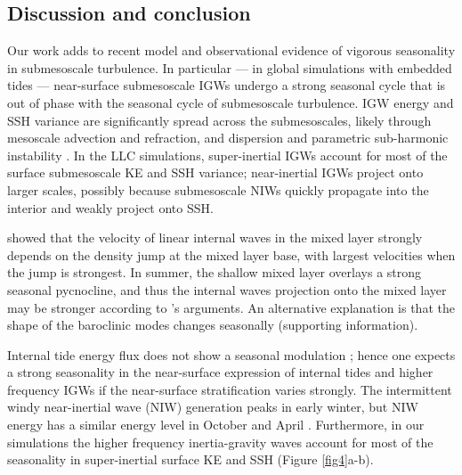 \documentclass[grl]{agutex2015}
\begin{document}
\begin{article}
\section{Discussion and conclusion}
Our work adds to recent model \citep[e.g., ][]{sasaki_etal2014}
and observational \citep[e.g., ][]{callies_etal2015,buckingham_etal2016} evidence of vigorous seasonality in
submesoscale turbulence. In particular ---
in global simulations with embedded tides --- near-surface submesoscale IGWs undergo
a strong seasonal cycle that is out of phase with the seasonal cycle of
submesoscale turbulence. IGW energy and SSH variance are significantly spread across
the submesoscales, likely through mesoscale advection and refraction, and
dispersion \citep[e.g.,][and references therein]{ponte_klein2015,alford_etal2016}
 and parametric
sub-harmonic instability \citep[e.g., ][]{mackinnon_winters2005}.
In the LLC simulations,
super-inertial IGWs account for most of the surface submesoscale KE and SSH variance;
near-inertial IGWs project onto larger scales, possibly because submesoscale
NIWs quickly propagate into the interior and weakly project onto SSH.


\cite{dasaro1978} showed that the velocity of linear internal waves
in the mixed layer strongly depends on the density jump at the mixed layer
base, with largest velocities when the jump is strongest.
In summer, the shallow mixed layer overlays a strong seasonal pycnocline,
and thus the internal waves projection onto the mixed layer may be stronger
according to \cite{dasaro1978}'s arguments. An
alternative explanation is that the shape of the baroclinic modes
changes seasonally (supporting information).

Internal tide energy flux does not show a seasonal modulation \citep[e.g.,][]{alford2003};
hence one expects a strong seasonality in the near-surface
expression of internal tides and
higher frequency IGWs if the near-surface stratification varies strongly.
The intermittent windy near-inertial wave (NIW) generation peaks in early winter, but
NIW energy has a similar energy level in October and April
\citep{alford_etal2016}. Furthermore, in our simulations the higher frequency inertia-gravity waves
account for most of the seasonality in super-inertial surface KE and SSH
(Figure \ref{fig4}a-b).


\end{article}
\end{document}
